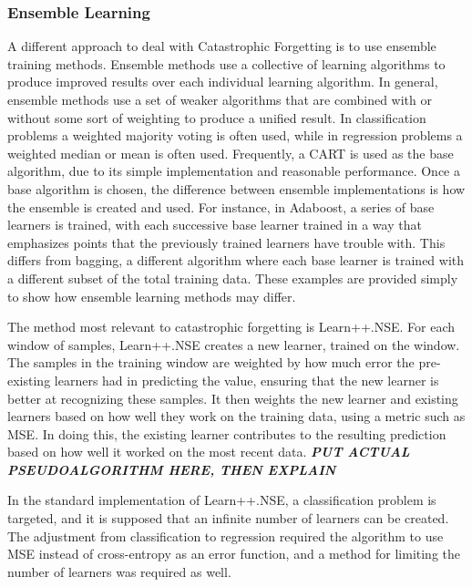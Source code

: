 \documentclass[11pt]{report}
\begin{document}
	\subsubsection{Ensemble Learning}\label{bg:advanced_ensemble}
	\par A different approach to deal with Catastrophic Forgetting is to use ensemble training methods. Ensemble methods use a collective of learning algorithms to produce improved results over each individual learning algorithm. In general, ensemble methods use a set of weaker algorithms that are combined with or without some sort of weighting to produce a unified result. In classification problems a weighted majority voting is often used, while in regression problems a weighted median or mean is often used. Frequently, a CART is used as the base algorithm, due to its simple implementation and reasonable performance. Once a base algorithm is chosen, the difference between ensemble implementations is how the ensemble is created and used. For instance, in Adaboost, a series of base learners is trained, with each successive base learner trained in a way that emphasizes points that the previously trained learners have trouble with. This differs from bagging, a different algorithm where each base learner is trained with a different subset of the total training data. These examples are provided simply to show how ensemble learning methods may differ.
	\par The method most relevant to catastrophic forgetting is Learn++.NSE. For each window of samples, Learn++.NSE creates a new learner, trained on the window. The samples in the training window are weighted by how much error the pre-existing learners had in predicting the value, ensuring that the new learner is better at recognizing these samples. It then weights the new learner and existing learners based on how well they work on the training data, using a metric such as MSE. In doing this, the existing learner contributes to the resulting prediction based on how well it worked on the most recent data. 
	\textbf{\textit{PUT ACTUAL PSEUDOALGORITHM HERE, THEN EXPLAIN}}
	\par In the standard implementation of Learn++.NSE, a classification problem is targeted, and it is supposed that an infinite number of learners can be created. The adjustment from classification to regression required the algorithm to use MSE instead of cross-entropy as an error function, and a method for limiting the number of learners was required as well. 
\end{document}
